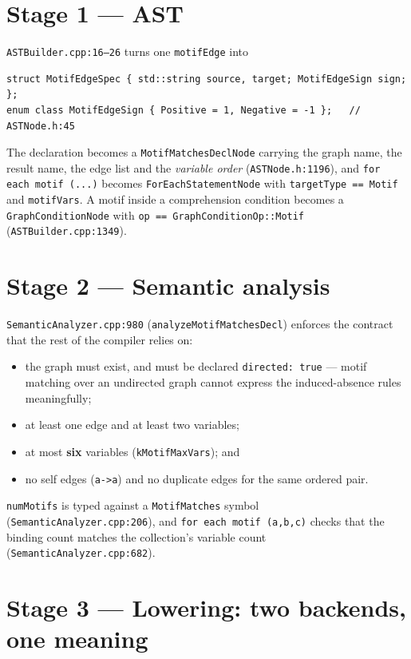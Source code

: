 \documentclass[11pt,a4paper]{article}
\newcommand{\code}[1]{\texttt{#1}}
\newcommand{\file}[1]{\texttt{#1}}
\begin{document}
\section{Stage 1 --- AST}

\file{ASTBuilder.cpp:16--26} turns one \code{motifEdge} into

\begin{lstlisting}[style=cpp]
struct MotifEdgeSpec { std::string source, target; MotifEdgeSign sign; };
enum class MotifEdgeSign { Positive = 1, Negative = -1 };   // ASTNode.h:45
\end{lstlisting}

The declaration becomes a \code{MotifMatchesDeclNode} carrying the graph name,
the result name, the edge list and the \emph{variable order}
(\file{ASTNode.h:1196}), and \code{for each motif (...)} becomes
\code{ForEachStatementNode} with \code{targetType == Motif} and
\code{motifVars}. A motif inside a comprehension condition becomes a
\code{GraphConditionNode} with \code{op == GraphConditionOp::Motif}
(\file{ASTBuilder.cpp:1349}).

\section{Stage 2 --- Semantic analysis}

\file{SemanticAnalyzer.cpp:980} (\code{analyzeMotifMatchesDecl}) enforces the
contract that the rest of the compiler relies on:

\begin{itemize}
  \item the graph must exist, and must be declared \code{directed: true}
        --- motif matching over an undirected graph cannot express the
        induced-absence rules meaningfully;
  \item at least one edge and at least two variables;
  \item at most \textbf{six} variables (\code{kMotifMaxVars}); and
  \item no self edges (\code{a->a}) and no duplicate edges for the same ordered
        pair.
\end{itemize}

\code{numMotifs} is typed against a \code{MotifMatches} symbol
(\file{SemanticAnalyzer.cpp:206}), and \code{for each motif (a,b,c)} checks that
the binding count matches the collection's variable count
(\file{SemanticAnalyzer.cpp:682}).

\section{Stage 3 --- Lowering: two backends, one meaning}
\label{sec:backends}
\end{document}
